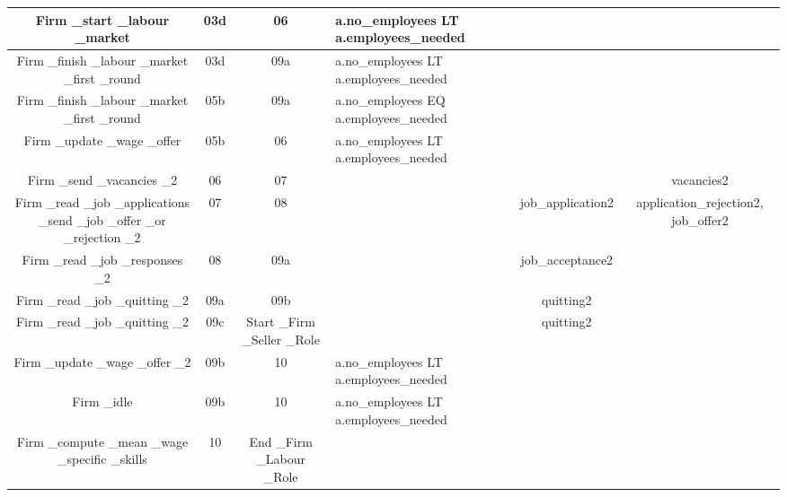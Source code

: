\begin{landscape}
\begin{table}[!htb]
\begin{center}
\begin{tabular}{|c|c|c|l|c|c|}
{\parbox[l]{5cm}{Firm \_start \_labour \_market}}&
{\parbox[l]{3cm}{03d}}&
{\parbox[l]{3cm}{06}}&{\parbox[l]{4cm}{a.no\_employees LT
a.employees\_needed}}
 & &
\\
\hline {\parbox[l]{5cm}{Firm \_finish \_labour \_market \_first
\_round}}& {\parbox[l]{3cm}{03d}}&
{\parbox[l]{3cm}{09a}}&{\parbox[l]{4cm}{a.no\_employees LT
a.employees\_needed}} & &
\\
\hline {\parbox[l]{5cm}{Firm \_finish \_labour \_market \_first
\_round}}& {\parbox[l]{3cm}{05b}}&
{\parbox[l]{3cm}{09a}}&{\parbox[l]{4cm}{a.no\_employees EQ
a.employees\_needed}}
 & &
\\

\hline {\parbox[l]{5cm}{Firm \_update \_wage \_offer}}&
{\parbox[l]{3cm}{05b}}&
{\parbox[l]{3cm}{06}}&{\parbox[l]{4cm}{a.no\_employees LT
a.employees\_needed}}
 & &
\\

\hline {\parbox[l]{5cm}{Firm \_send \_vacancies \_2}}&
{\parbox[l]{3cm}{06}}& {\parbox[l]{3cm}{07}}&
 & & {\parbox[l]{3cm}{vacancies2}}
 \\

\hline {\parbox[l]{5cm}{Firm \_read \_job \_applications \_send
\_job \_offer \_or \_rejection \_2}}& {\parbox[l]{3cm}{07}}&
{\parbox[l]{3cm}{08}}& &{\parbox[l]{3cm}{job\_application2}} &
{\parbox[l]{3cm}{application\_rejection2, job\_offer2}}
\\

\hline {\parbox[l]{5cm}{Firm \_read \_job \_responses \_2}}&
{\parbox[l]{3cm}{08}}& {\parbox[l]{3cm}{09a}}& &
{\parbox[l]{3cm}{job\_acceptance2}} &
\\

\hline {\parbox[l]{5cm}{Firm \_read \_job \_quitting \_2}}&
{\parbox[l]{3cm}{09a}}&
{\parbox[l]{3cm}{09b}}&&{\parbox[l]{3cm}{quitting2}}
 &
\\
\hline {\parbox[l]{5cm}{Firm \_read \_job \_quitting \_2}}&
{\parbox[l]{3cm}{09c}}& {\parbox[l]{4cm}{Start \_Firm \_Seller
\_Role}}&& {\parbox[l]{3cm}{quitting2}}
 &
\\

\hline {\parbox[l]{5cm}{Firm \_update \_wage \_offer \_2}}&
{\parbox[l]{3cm}{09b}}&
{\parbox[l]{3cm}{10}}&{\parbox[l]{4cm}{a.no\_employees LT
a.employees\_needed}}
 & &
\\

\hline {\parbox[l]{5cm}{Firm \_idle}}& {\parbox[l]{3cm}{09b}}&
{\parbox[l]{3cm}{10}}&{\parbox[l]{4cm}{a.no\_employees LT
a.employees\_needed}}
 & &
\\

\hline {\parbox[l]{5cm}{Firm \_compute \_mean \_wage \_specific
\_skills}}& {\parbox[l]{3cm}{10}}& {\parbox[l]{4cm}{End \_Firm
\_Labour \_Role}}&
 & &
\\
\hline


\end{tabular}\end{center}\label{tab:labourfirm}
\end{table}
\end{landscape}

